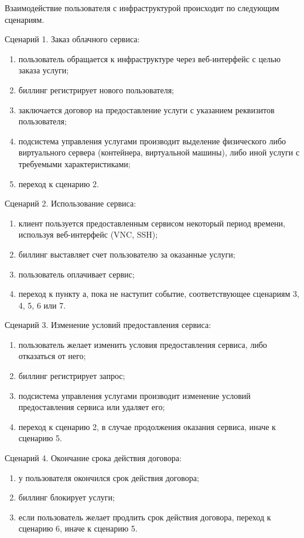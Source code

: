 Взаимодействие пользователя с инфраструктурой происходит по следующим сценариям.

Сценарий 1. Заказ облачного сервиса:
\begin{enumerate}
  \item пользователь обращается к инфраструктуре через веб-интерфейс с целью заказа услуги;
  \item биллинг регистрирует нового пользователя;
  \item заключается договор на предоставление услуги с указанием реквизитов пользователя;
  \item подсистема управления услугами производит выделение физического либо виртуального сервера (контейнера, виртуальной машины), либо иной услуги с требуемыми характеристиками;
  \item переход к сценарию 2.
\end{enumerate}

Сценарий 2. Использование сервиса:
\begin{enumerate}
  \item клиент пользуется предоставленным сервисом некоторый период времени, используя веб-интерфейс (VNC, SSH);
  \item биллинг выставляет счет пользователю за оказанные услуги;
  \item пользователь оплачивает сервис;
  \item переход к пункту а, пока не наступит событие, соответствующее сценариям 3, 4, 5, 6 или 7.
\end{enumerate}

Сценарий 3. Изменение условий предоставления сервиса:
\begin{enumerate}
  \item пользователь желает изменить условия предоставления сервиса, либо отказаться от него;
  \item биллинг регистрирует запрос;
  \item подсистема управления услугами производит изменение условий предоставления сервиса или удаляет его;
  \item переход к сценарию 2, в случае продолжения оказания сервиса, иначе к сценарию 5.
\end{enumerate}

Сценарий 4. Окончание срока действия договора:
\begin{enumerate}
  \item у пользователя окончился срок действия договора;
  \item биллинг блокирует услуги;
  \item если пользователь желает продлить срок действия договора, переход к сценарию 6, иначе к сценарию 5.
\end{enumerate}

